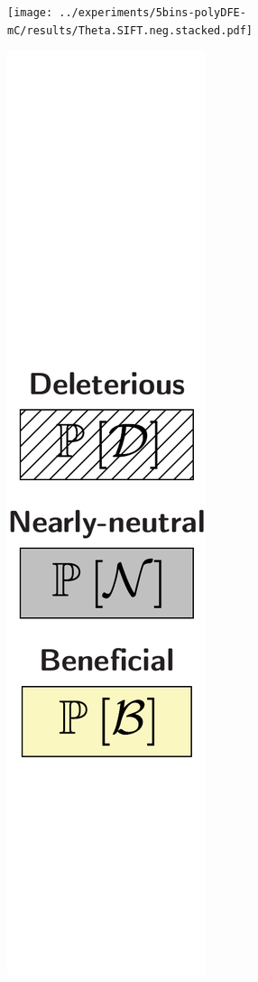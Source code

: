 \documentclass{article}
\begin{document}
\begin{center}
\begin{minipage}{0.09\linewidth}
        \end{minipage}
        \begin{minipage}{0.9\linewidth}
            \texttt{[image: ../experiments/5bins-polyDFE-mC/results/Theta.SIFT.neg.stacked.pdf]} \\
        \end{minipage}
        \begin{minipage}{0.09\linewidth}
            \includegraphics[width=\linewidth, page=1]{artworks/legend.polycat}

\end{minipage}
\end{center}
\end{document}
